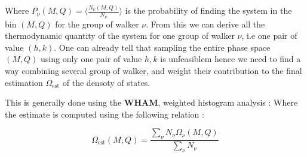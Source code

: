\documentclass[ansiapaper]{report}
\begin{document}
\begin{multicols}{3}
Where $ P_{\nu}(M,Q) = \langle \frac{N_{\nu}(M,Q)}{N_{\nu}}\rangle $ is the probability of finding the system in the bin $(M,Q)$ for the group of walker $\nu$. From this we can derive all the thermodynamic quantity of the system for one group of walker $\nu$, i.e one pair of value $(h,k)$. One can already tell that sampling the entire phase space $(M,Q)$ using only one pair of value $h,k$ is unfeasiblem hence we need to find a way combining several group of walker, and weight their contribution to the final estimation $\Omega_{\text{est}}$ of the densoty of states. 

This is generally done using the \textbf{WHAM}, weighted histogram analysis : Where the estimate is computed using the following relation : 

    \begin{equation}
        \Omega_{\text{est}}(M,Q) = \frac{\sum_{\nu} N_{\nu} \Omega_{\nu}(M,Q)}{\sum_{\nu} N_{\nu}}
        \label{eq:WHAM}
    \end{equation}



\end{multicols}
\end{document}
